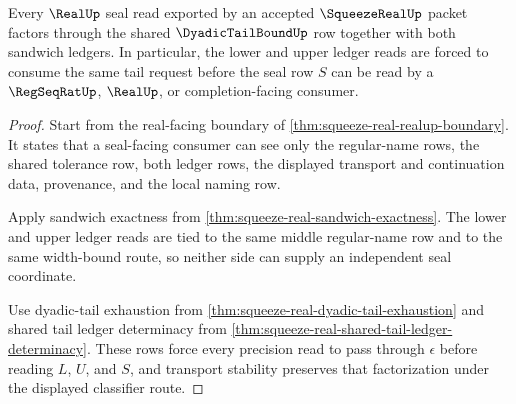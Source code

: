 \begin{theorem}
\label{thm:squeeze-real-shared-tail-real-seal-factorization}
Every $\RealUp$ seal read exported by an accepted $\SqueezeRealUp$ packet factors through the shared $\DyadicTailBoundUp$ row together with both sandwich ledgers. In particular, the lower and upper ledger reads are forced to consume the same tail request before the seal row $S$ can be read by a $\RegSeqRatUp$, $\RealUp$, or completion-facing consumer.
\end{theorem}
\begin{proof}
Start from the real-facing boundary of \autoref{thm:squeeze-real-realup-boundary}. It states that a seal-facing consumer can see only the regular-name rows, the shared tolerance row, both ledger rows, the displayed transport and continuation data, provenance, and the local naming row.

Apply sandwich exactness from \autoref{thm:squeeze-real-sandwich-exactness}. The lower and upper ledger reads are tied to the same middle regular-name row and to the same width-bound route, so neither side can supply an independent seal coordinate.

Use dyadic-tail exhaustion from \autoref{thm:squeeze-real-dyadic-tail-exhaustion} and shared tail ledger determinacy from \autoref{thm:squeeze-real-shared-tail-ledger-determinacy}. These rows force every precision read to pass through $\epsilon$ before reading $L$, $U$, and $S$, and transport stability preserves that factorization under the displayed classifier route.
\end{proof}

